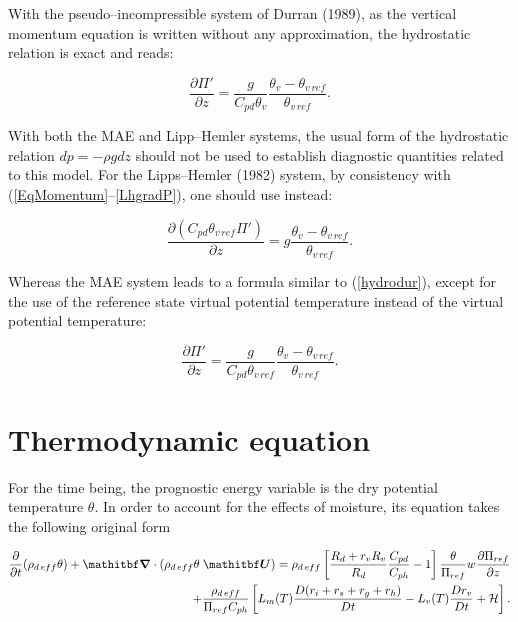 With the pseudo--incompressible system of Durran (1989), as the vertical momentum equation
is written without any approximation, the hydrostatic relation is exact and reads:

\begin{equation}
\dfrac{\partial \Pi '}{\partial z} = \dfrac{g} {C_{pd} \theta_{v}}
\dfrac{\theta_v-\theta_{v\,ref}} {\theta_{v\,ref}}.
\label{hydrodur}
\end{equation}

With both the MAE and Lipp--Hemler systems, the usual form of the hydrostatic
relation $dp=-\rho g dz$ should not be used to establish diagnostic quantities
related to this model. For the Lipps--Hemler (1982) system, by consistency with
(\ref{EqMomentum}--\ref{LhgradP}), one should use instead:

\begin{equation}
\dfrac{\partial (C_{pd} \theta_{v\,ref} \Pi ')}{\partial z} = g \dfrac{\theta_v-\theta_{v\,ref}}
{\theta_{v\,ref}}.
\end{equation}

Whereas the MAE system leads to a formula similar to (\ref{hydrodur}), except for the use
of the reference state virtual potential temperature instead of the virtual potential
temperature:

\begin{equation}
\dfrac{\partial \Pi '}{\partial z} = \dfrac{g} {C_{pd} \theta_{v\,ref}}
\dfrac{\theta_v-\theta_{v\,ref}} {\theta_{v\,ref}}.
\end{equation}

\section{Thermodynamic equation}
For the time being, the prognostic energy variable is the dry potential
temperature $\theta$. In order to account for the effects of moisture, its
equation takes the following original form

\begin{eqnarray}
\dfrac{\partial}{\partial t}(\rho_{d\,eff} \theta)  + \vec{ \nabla} \cdot
(\rho_{d\,eff} \theta \;\vec{U})
= \rho_{d\,eff} \left[ {R_d+r_vR_v\over R_d}{C_{pd} \over C_{ph}}-1 \right]
{\theta \over \Pi_{ref}} w {\partial \Pi_{ref} \over \partial z}
\nonumber \\
+ {\rho_{d\,eff}\over \Pi_{ref} C_{ph}} \left[
 L_m(T) {D(r_i+r_s+r_g+r_h)\over Dt} - L_v(T) {Dr_v\over Dt} + {\cal H}  \right].
\end{eqnarray}

